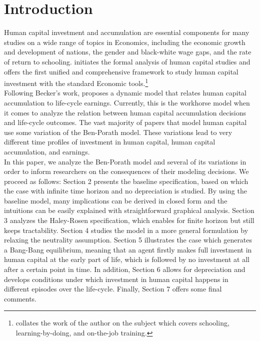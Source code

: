 \section{Introduction}
\noindent Human capital investment and accumulation are essential components for many studies on a wide range of topics in Economics, including the economic growth and development of nations, the gender and black-white wage gaps, and the rate of return to schooling. \citet{becker1962investment} initiates the formal analysis of human capital studies and offers the first unified and comprehensive framework to study human capital investment with the standard Economic tools.\footnote{\citet{becker2009human} collates the work of the author on the subject which covers schooling, learning-by-doing, and on-the-job training.} \\
\indent Following Becker's work, \citet{ben1967production} proposes a dynamic model that relates human capital accumulation to life-cycle earnings. Currently, this is the workhorse model when it comes to analyze the relation between human capital accumulation decisions and life-cycle outcomes. The vast majority of papers that model human capital use some variation of the Ben-Porath model. These variations lead to very different time profiles of investment in human capital, human capital accumulation, and earnings.\\
\indent In this paper, we analyze the Ben-Porath model and several of its variations in order to inform researchers on the consequences of their modeling decisions. We proceed as follows: Section 2 presents the baseline specification, based on which the case with infinite time horizon and no depreciation is studied. By using the baseline model, many implications can be derived in closed form and the intuitions can be easily explained with straightforward graphical analysis. Section 3 analyzes the Haley-Rosen specification, which enables for finite horizon but still keeps tractability. Section 4 studies the model in a more general formulation by relaxing the neutrality assumption. Section 5 illustrates the case which generates a Bang-Bang equilibrium, meaning that an agent firstly makes full investment in human capital at the early part of life, which is followed by no investment at all after a certain point in time. In addition, Section 6 allows for depreciation and develops conditions under which investment in human capital happens in different episodes over the life-cycle. Finally, Section 7 offers some final comments. \\

